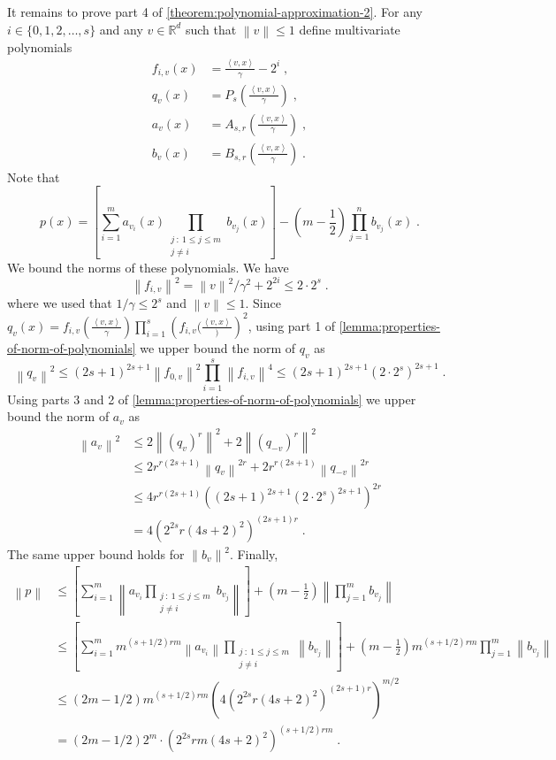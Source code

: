 \documentclass[12pt]{article}
\newcommand{\R}{\mathbb{R}}  %
\newcommand{\ip}[2]{\left\langle #1, #2 \right\rangle} %
\newcommand{\norm}[1]{\left\| #1 \right\|}  %
\begin{document}
It remains to prove part 4 of \autoref{theorem:polynomial-approximation-2}.
For any $i \in \{0,1,2,\dots,s\}$ and any $v \in \R^d$ such that $\norm{v} \le 1$
define multivariate polynomials
\begin{align*}
f_{i,v}(x) & = \frac{\ip{v}{x}}{\gamma} - 2^i \; , \\
q_v(x) & = P_s \left( \frac{\ip{v}{x}}{\gamma} \right) \; , \\
a_v(x) & = A_{s,r} \left( \frac{\ip{v}{x}}{\gamma} \right) \; , \\
b_v(x) & = B_{s,r} \left( \frac{\ip{v}{x}}{\gamma} \right) \; .
\end{align*}
Note that
$$
p(x) = \left[ \sum_{i=1}^m a_{v_i}(x) \prod_{\substack{j ~:~ 1 \le j \le m \\ j \neq i}} b_{v_j}(x) \right] - \left(m - \frac{1}{2} \right) \prod_{j=1}^n b_{v_j}(x) \; .
$$
We bound the norms of these polynomials. We have
$$
\norm{f_{i,v}}^2 = \norm{v}^2/\gamma^2 + 2^{2i} \le 2 \cdot 2^s \; .
$$
where we used that $1/\gamma \le 2^s$ and $\norm{v} \le 1$.
Since $q_v(x) = f_{i,v}(\frac{\ip{v}{x}}{\gamma}) \prod_{i=1}^s \left(f_{i,v}(\frac{\ip{v}{x}})\right)^2$,
using part 1 of \autoref{lemma:properties-of-norm-of-polynomials} we upper bound the norm of $q_v$
as
$$
\norm{q_v}^2 \le (2s+1)^{2s+1} \norm{f_{0,v}}^2 \prod_{i=1}^s \norm{f_{i,v}}^4 \le  (2s+1)^{2s+1} (2 \cdot 2^s)^{2s + 1} \; .
$$
Using parts 3 and 2 of \autoref{lemma:properties-of-norm-of-polynomials} we upper bound the norm of $a_v$ as
\begin{align*}
\norm{a_v}^2
& \le 2\norm{(q_v)^r}^2 + 2\norm{(q_{-v})^r}^2 \\
& \le 2 r^{r(2s+1)} \norm{q_v}^{2r} + 2 r^{r(2s+1)} \norm{q_{-v}}^{2r} \\
& \le 4 r^{r(2s+1)} \left((2s+1)^{2s+1} (2 \cdot 2^s)^{2s + 1} \right)^{2r} \\
& = 4 \left(2^{2s} r (4s+2)^2 \right)^{(2s+1)r} \; .
\end{align*}
The same upper bound holds for $\norm{b_v}^2$. Finally,
\begin{align*}
\norm{p}
& \le \left[ \sum_{i=1}^m \norm{a_{v_i} \prod_{\substack{j ~:~ 1 \le j \le m \\ j \neq i}} b_{v_j}} \right] + \left(m - \frac{1}{2} \right) \norm{\prod_{j=1}^m b_{v_j}} \\
& \le \left[ \sum_{i=1}^m m^{(s+1/2)rm} \norm{a_{v_i}} \prod_{\substack{j ~:~ 1 \le j \le m \\ j \neq i}} \norm{b_{v_j}} \right] + \left(m - \frac{1}{2} \right) m^{(s+1/2)rm} \prod_{j=1}^m \norm{b_{v_j}} \\
& \le (2m-1/2) m^{(s+1/2)rm} \left(4 \left(2^{2s} r (4s+2)^2 \right)^{(2s+1)r} \right)^{m/2} \\
& = (2m-1/2) 2^m \cdot \left(2^{2s} rm (4s+2)^2 \right)^{(s+1/2)rm} \; .
\end{align*}
\end{document}
